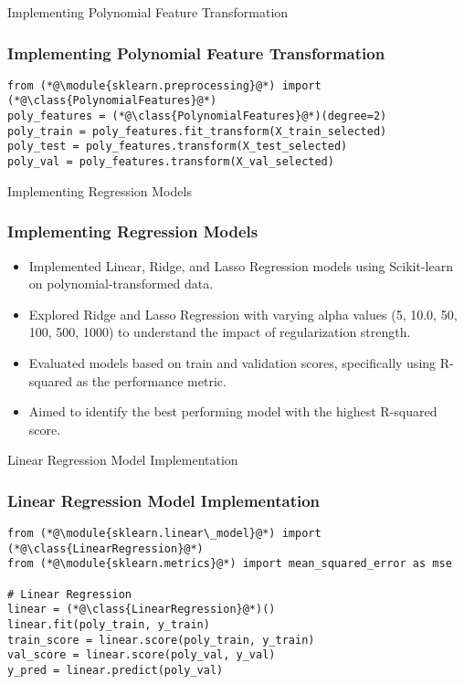 \begin{frame}[fragile]{Implementing Polynomial Feature Transformation}
    \frametitle{Implementing Polynomial Feature Transformation}
    \begin{lstlisting}[caption={Polynomial feature transformation using \texttt{sklearn.preprocessing}.}, label=lst:polynomial_feature_transformation]
from (*@\module{sklearn.preprocessing}@*) import (*@\class{PolynomialFeatures}@*)
poly_features = (*@\class{PolynomialFeatures}@*)(degree=2)
poly_train = poly_features.fit_transform(X_train_selected)
poly_test = poly_features.transform(X_test_selected)
poly_val = poly_features.transform(X_val_selected)
    \end{lstlisting}
\end{frame}

\begin{frame}{Implementing Regression Models}
    \frametitle{Implementing Regression Models}
    \begin{itemize}
        \item Implemented Linear, Ridge, and Lasso Regression models using Scikit-learn on polynomial-transformed data.
        \item Explored Ridge and Lasso Regression with varying alpha values (5, 10.0, 50, 100, 500, 1000) to understand the impact of regularization strength.
        \item Evaluated models based on train and validation scores, specifically using R-squared as the performance metric.
        \item Aimed to identify the best performing model with the highest R-squared score.
    \end{itemize}
\end{frame}

\begin{frame}[fragile]{Linear Regression Model Implementation}
    \frametitle{Linear Regression Model Implementation}
    \begin{lstlisting}[caption={Implementing Linear Regression using sklearn.linear\_model.}, label=lst:linear_regression_implementation]
from (*@\module{sklearn.linear\_model}@*) import (*@\class{LinearRegression}@*)
from (*@\module{sklearn.metrics}@*) import mean_squared_error as mse

# Linear Regression
linear = (*@\class{LinearRegression}@*)()
linear.fit(poly_train, y_train)
train_score = linear.score(poly_train, y_train)
val_score = linear.score(poly_val, y_val)
y_pred = linear.predict(poly_val)
    \end{lstlisting}
\end{frame}


